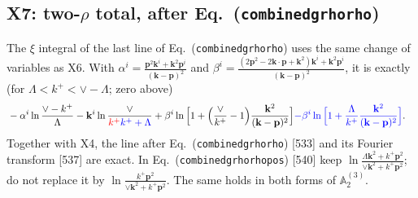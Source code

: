 \documentclass[10pt]{article}
\def\mf#1{\mathbb{#1}}
\def\v#1{\mathbf{#1}}
\newcommand{\old}[1]{{\color{red}#1}}
\newcommand{\new}[1]{{\color{blue}#1}}
\newcommand{\eqn}[1]{Eq.~(\texttt{#1})}
\begin{document}
\subsection{X7: two-$\rho$ total, after \eqn{combinedgrhorho}}
The $\xi$ integral of the last line of \eqn{combinedgrhorho} uses the same change of variables as X6. With
$\alpha^i=\frac{\v p^2\v k^i+\v k^2\v p^i}{(\v k-\v p)^2}$ and $\beta^i=\frac{(2\v p^2-2\v k\cdot\v p+\v k^2)\v k^i+\v k^2\v p^i}{(\v k-\v p)^2}$, it is exactly (for $\Lambda<k^+<\vee-\Lambda$; zero above)
\begin{align}
&-\alpha^i\ln\frac{\vee-k^+}{\Lambda}-\v k^i\ln\frac{\vee}{\old{k^+}\new{k^++\Lambda}}+\beta^i\ln\Big[1+\Big(\frac{\vee}{k^+}-1\Big)\frac{\v k^2}{(\v k-\v p)^2}\Big]\new{-\beta^i\ln\Big[1+\frac{\Lambda}{k^+}\frac{\v k^2}{(\v k-\v p)^2}\Big]}.
\end{align}
Together with X4, the line after \eqn{combinedgrhorho} [533] and its Fourier transform [537] are exact. In \eqn{combinedgrhorhopos} [540] keep $\ln\frac{\Lambda\v k^2+k^+\v p^2}{\vee\v k^2+k^+\v p^2}$; do not replace it by $\ln\frac{k^+\v p^2}{\vee\v k^2+k^+\v p^2}$. The same holds in both forms of $\mf A^{(3)}_2$.

\end{document}
